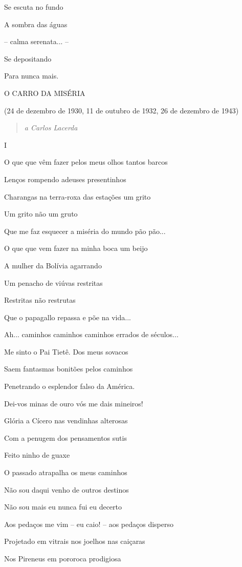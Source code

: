Se escuta no fundo

A sombra das águas

-- calma serenata... --

Se depositando

Para nunca mais.

\textsc{O CARRO DA MISÉRIA}

(24 de dezembro de 1930, 11 de outubro de 1932, 26 de dezembro de 1943)

\begin{quote}
\emph{a Carlos Lacerda}
\end{quote}

I

O que que vêm fazer pelos meus olhos tantos barcos

Lenços rompendo adeuses presentinhos

Charangas na terra-roxa das estações um grito

Um grito não um gruto

Que me faz esquecer a miséria do mundo pão pão...

O que que vem fazer na minha boca um beijo

A mulher da Bolívia agarrando

Um penacho de viúvas restritas

Restritas não restrutas

Que o papagallo repassa e põe na vida...

Ah... caminhos caminhos caminhos errados de séculos...

Me sinto o Pai Tietê. Dos meus sovacos

Saem fantasmas bonitões pelos caminhos

Penetrando o esplendor falso da América.

Dei-vos minas de ouro vós me dais mineiros!

Glória a Cícero nas vendinhas alterosas

Com a penugem dos pensamentos sutis

Feito ninho de guaxe

O passado atrapalha os meus caminhos

Não sou daqui venho de outros destinos

Não sou mais eu nunca fui eu decerto

Aos pedaços me vim -- eu caio! -- aos pedaços disperso

Projetado em vitrais nos joelhos nas caiçaras

Nos Pireneus em pororoca prodigiosa

